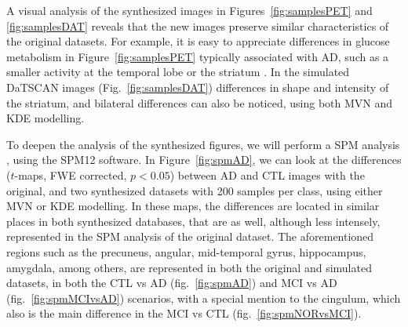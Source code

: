 A visual analysis of the synthesized images in Figures~\ref{fig:samplesPET} and \ref{fig:samplesDAT} reveals that the new images preserve similar characteristics of the original datasets. For example, it is easy to appreciate differences in glucose metabolism in Figure~\ref{fig:samplesPET} typically associated with \ac{AD}, such as a smaller activity at the temporal lobe or the striatum \cite{Stoeckel04,Illan2011}. In the simulated DaTSCAN images (Fig.~\ref{fig:samplesDAT}) differences in shape and intensity of the striatum, and bilateral differences \cite{Towey2011,Illan2012,martinez2014parametrization} can also be noticed, using both \ac{MVN} and \ac{KDE} modelling.

To deepen the analysis of the synthesized figures, we will perform a \ac{SPM} analysis \cite{spm_book}, using the SPM12 software. In Figure~\ref{fig:spmAD}, we can look at the differences ($t$-maps, FWE corrected, $p<0.05$) between \ac{AD} and \ac{CTL} images with the original, and two synthesized datasets with 200 samples per class, using either \ac{MVN} or \ac{KDE} modelling. In these maps, the differences are located in similar places in both synthesized databases, that are as well, although less intensely, represented in the \ac{SPM} analysis of the original dataset. The aforementioned regions such as the precuneus, angular, mid-temporal gyrus, hippocampus, amygdala, among others, are represented in both the original and simulated datasets, in both the \ac{CTL} vs \ac{AD} (fig.~\ref{fig:spmAD}) and \ac{MCI} vs \ac{AD} (fig.~\ref{fig:spmMCIvsAD}) scenarios, with a special mention to the cingulum, which also is the main difference in the \ac{MCI} vs \ac{CTL} (fig.~\ref{fig:spmNORvsMCI}). 

